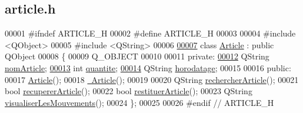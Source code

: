 \hypertarget{article_8h_source}{}\subsection{article.\+h}
\label{article_8h_source}

\begin{DoxyCode}
00001 \textcolor{preprocessor}{#ifndef ARTICLE\_H}
00002 \textcolor{preprocessor}{#define ARTICLE\_H}
00003 
00004 \textcolor{preprocessor}{#include <QObject>}
00005 \textcolor{preprocessor}{#include <QString>}
00006 
\hyperlink{class_article}{00007} \textcolor{keyword}{class }\hyperlink{class_article}{Article} : \textcolor{keyword}{public} QObject
00008 \{
00009     Q\_OBJECT
00010 
00011 \textcolor{keyword}{private}:
\hyperlink{class_article_a0ba6c08f7dd54e4b7caf673ecd6b41a6}{00012}     QString \hyperlink{class_article_a0ba6c08f7dd54e4b7caf673ecd6b41a6}{nomArticle};
\hyperlink{class_article_a4bb0882b68de349e913fd0b46bf6da6a}{00013}     \textcolor{keywordtype}{int} \hyperlink{class_article_a4bb0882b68de349e913fd0b46bf6da6a}{quantite};
\hyperlink{class_article_ae7a9ee7f0b2bd423ff995819fa78ac17}{00014}     QString \hyperlink{class_article_ae7a9ee7f0b2bd423ff995819fa78ac17}{horodatage};
00015 
00016 \textcolor{keyword}{public}:
00017     \hyperlink{class_article_aba1b3142ede0565d468cb4135384c96f}{Article}();
00018     \hyperlink{class_article_a5c429e49b30104b1069044d0e1a6aa1a}{~Article}();
00019 
00020     QString \hyperlink{class_article_ad7b031dd9bd88a84006f2ff83262c42d}{rechercherArticle}();
00021     \textcolor{keywordtype}{bool} \hyperlink{class_article_a6200b67a7afe1c4e937c4087e23cdfc4}{recupererArticle}();
00022     \textcolor{keywordtype}{bool} \hyperlink{class_article_acd0f9d62ff85d4254d3ca6ab87d474e2}{restituerArticle}();
00023     QString \hyperlink{class_article_a47f169939af6d2d3e840392c85c88121}{visualiserLesMouvements}();
00024 \};
00025 
00026 \textcolor{preprocessor}{#endif // ARTICLE\_H}
\end{DoxyCode}
